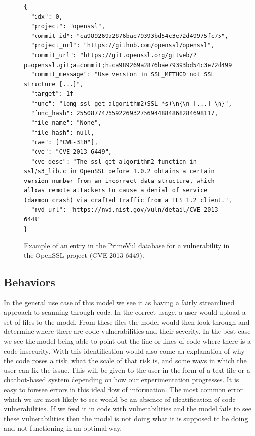 \documentclass{article}
\begin{document}
\begin{figure}
\begin{verbatim}
{
  "idx": 0,
  "project": "openssl",
  "commit_id": "ca989269a2876bae79393bd54c3e72d49975fc75",
  "project_url": "https://github.com/openssl/openssl",
  "commit_url": "https://git.openssl.org/gitweb/?p=openssl.git;a=commit;h=ca989269a2876bae79393bd54c3e72d49975fc75",
  "commit_message": "Use version in SSL_METHOD not SSL structure [...]",
  "target": 1f
  "func": "long ssl_get_algorithm2(SSL *s)\n{\n [...] \n}",
  "func_hash": 255087747659226932756944884868284698117,
  "file_name": "None",
  "file_hash": null,
  "cwe": ["CWE-310"],
  "cve": "CVE-2013-6449",
  "cve_desc": "The ssl_get_algorithm2 function in ssl/s3_lib.c in OpenSSL before 1.0.2 obtains a certain version number from an incorrect data structure, which allows remote attackers to cause a denial of service (daemon crash) via crafted traffic from a TLS 1.2 client.",
  "nvd_url": "https://nvd.nist.gov/vuln/detail/CVE-2013-6449"
}
\end{verbatim}
\caption{Example of an entry in the PrimeVul database for a vulnerability in the OpenSSL project (CVE-2013-6449).}
\label{fig:primevul_example}
\end{figure}

\subsection{Behaviors}
In the general use case of this model we see it as having a fairly streamlined approach to scanning through code. In the correct usage, a user would upload a set of files to the model. From these files the model would then look through and determine where there are code vulnerabilities and their severity. In the best case we see the model being able to point out the line or lines of code where there is a code insecurity. With this identification would also come an explanation of why the code poses a risk, what the scale of that risk is, and some ways in which the user can fix the issue. This will be given to the user in the form of a text file or a chatbot-based system depending on how our experimentation progresses. 
It is easy to foresee errors in this ideal flow of information. The most common error which we are most likely to see would be an absence of identification of code vulnerabilities. If we feed it in code with vulnerabilities and the model fails to see these vulnerabilities then the model is not doing what it is supposed to be doing and not functioning in an optimal way. 
\end{document}
